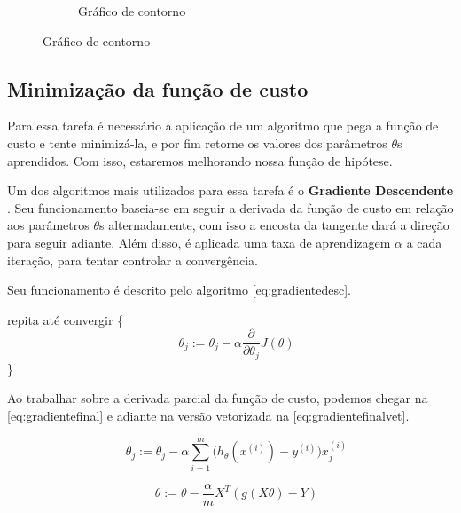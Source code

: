 \begin{figure}
\begin{subfigure}[htb]{0.5\textwidth}
    \caption{Gráfico de contorno} \label{fig:funcaodecustocontorno}
  \end{subfigure} 

\end{figure}


\subsection{Minimização da função de custo}

Para essa tarefa é necessário a aplicação de um algoritmo que pega a função de custo e tente minimizá-la, e por fim retorne os valores dos parâmetros $ \theta $s aprendidos. Com isso, estaremos melhorando nossa função de hipótese. 

Um dos algoritmos mais utilizados para essa tarefa é o \textbf{Gradiente Descendente} \cite{michalski2013machine}. Seu funcionamento baseia-se em seguir a derivada da função de custo em relação aos parâmetros $\theta$s alternadamente, com isso a encosta da tangente dará a direção para seguir adiante. Além disso, é aplicada uma taxa de aprendizagem $ \alpha $ a cada iteração, para tentar controlar a convergência.

Seu funcionamento é descrito pelo algoritmo \ref{eq:gradientedesc}.

repita até convergir \{
\begin{equation}
\label{eq:gradientedesc}
\quad \theta_j := \theta_j - \alpha \frac{\partial}{\partial\theta_j} J(\theta)
\end{equation}
\quad\quad\quad \}

Ao trabalhar sobre a derivada parcial da função de custo, podemos chegar na \autoref{eq:gradientefinal} e adiante na versão vetorizada na \autoref{eq:gradientefinalvet}. 

\begin{equation}
\quad \theta_j := \theta_j - \alpha \sum\limits_{i=1}^{m}\Big(h_{\theta}(x^{(i)}) - y^{(i)} \Big) x_j^{(i)} \label{eq:gradientefinal}
\end{equation}

\begin{equation}
\quad \theta := \theta - \frac{\alpha}{m}X^T(g(X\theta) - Y) \label{eq:gradientefinalvet}
\end{equation}

